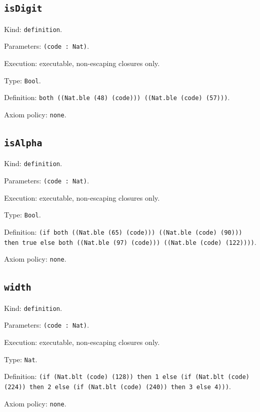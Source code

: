 \documentclass[11pt]{article}
\begin{document}
\subsection*{\texttt{isDigit}}
\noindent Kind: \texttt{definition}.\par
\noindent Parameters: \texttt{(code : Nat)}.\par
\noindent Execution: executable, non-escaping closures only.\par
\noindent Type: \texttt{Bool}.\par
\noindent Definition: \texttt{both ((Nat.ble (48) (code))) ((Nat.ble (code) (57)))}.\par
\noindent Axiom policy: \texttt{none}.\par
\subsection*{\texttt{isAlpha}}
\noindent Kind: \texttt{definition}.\par
\noindent Parameters: \texttt{(code : Nat)}.\par
\noindent Execution: executable, non-escaping closures only.\par
\noindent Type: \texttt{Bool}.\par
\noindent Definition: \texttt{(if both ((Nat.ble (65) (code))) ((Nat.ble (code) (90))) then true else both ((Nat.ble (97) (code))) ((Nat.ble (code) (122))))}.\par
\noindent Axiom policy: \texttt{none}.\par
\subsection*{\texttt{width}}
\noindent Kind: \texttt{definition}.\par
\noindent Parameters: \texttt{(code : Nat)}.\par
\noindent Execution: executable, non-escaping closures only.\par
\noindent Type: \texttt{Nat}.\par
\noindent Definition: \texttt{(if (Nat.blt (code) (128)) then 1 else (if (Nat.blt (code) (224)) then 2 else (if (Nat.blt (code) (240)) then 3 else 4)))}.\par
\noindent Axiom policy: \texttt{none}.\par
\end{document}
